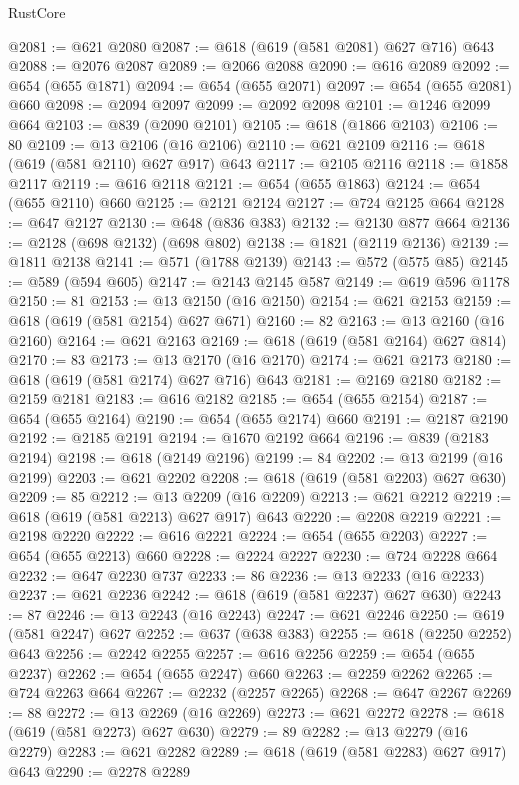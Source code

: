 \begin{lexlean}{RustCore}
\begin{coremodule}
@2081 := @621 @2080
@2087 := @618 (@619 (@581 @2081) @627 @716) @643
@2088 := @2076 @2087
@2089 := @2066 @2088
@2090 := @616 @2089
@2092 := @654 (@655 @1871)
@2094 := @654 (@655 @2071)
@2097 := @654 (@655 @2081) @660
@2098 := @2094 @2097
@2099 := @2092 @2098
@2101 := @1246 @2099 @664
@2103 := @839 (@2090 @2101)
@2105 := @618 (@1866 @2103)
@2106 := 80
@2109 := @13 @2106 (@16 @2106)
@2110 := @621 @2109
@2116 := @618 (@619 (@581 @2110) @627 @917) @643
@2117 := @2105 @2116
@2118 := @1858 @2117
@2119 := @616 @2118
@2121 := @654 (@655 @1863)
@2124 := @654 (@655 @2110) @660
@2125 := @2121 @2124
@2127 := @724 @2125 @664
@2128 := @647 @2127
@2130 := @648 (@836 @383)
@2132 := @2130 @877 @664
@2136 := @2128 (@698 @2132) (@698 @802)
@2138 := @1821 (@2119 @2136)
@2139 := @1811 @2138
@2141 := @571 (@1788 @2139)
@2143 := @572 (@575 @85)
@2145 := @589 (@594 @605)
@2147 := @2143 @2145 @587
@2149 := @619 @596 @1178
@2150 := 81
@2153 := @13 @2150 (@16 @2150)
@2154 := @621 @2153
@2159 := @618 (@619 (@581 @2154) @627 @671)
@2160 := 82
@2163 := @13 @2160 (@16 @2160)
@2164 := @621 @2163
@2169 := @618 (@619 (@581 @2164) @627 @814)
@2170 := 83
@2173 := @13 @2170 (@16 @2170)
@2174 := @621 @2173
@2180 := @618 (@619 (@581 @2174) @627 @716) @643
@2181 := @2169 @2180
@2182 := @2159 @2181
@2183 := @616 @2182
@2185 := @654 (@655 @2154)
@2187 := @654 (@655 @2164)
@2190 := @654 (@655 @2174) @660
@2191 := @2187 @2190
@2192 := @2185 @2191
@2194 := @1670 @2192 @664
@2196 := @839 (@2183 @2194)
@2198 := @618 (@2149 @2196)
@2199 := 84
@2202 := @13 @2199 (@16 @2199)
@2203 := @621 @2202
@2208 := @618 (@619 (@581 @2203) @627 @630)
@2209 := 85
@2212 := @13 @2209 (@16 @2209)
@2213 := @621 @2212
@2219 := @618 (@619 (@581 @2213) @627 @917) @643
@2220 := @2208 @2219
@2221 := @2198 @2220
@2222 := @616 @2221
@2224 := @654 (@655 @2203)
@2227 := @654 (@655 @2213) @660
@2228 := @2224 @2227
@2230 := @724 @2228 @664
@2232 := @647 @2230 @737
@2233 := 86
@2236 := @13 @2233 (@16 @2233)
@2237 := @621 @2236
@2242 := @618 (@619 (@581 @2237) @627 @630)
@2243 := 87
@2246 := @13 @2243 (@16 @2243)
@2247 := @621 @2246
@2250 := @619 (@581 @2247) @627
@2252 := @637 (@638 @383)
@2255 := @618 (@2250 @2252) @643
@2256 := @2242 @2255
@2257 := @616 @2256
@2259 := @654 (@655 @2237)
@2262 := @654 (@655 @2247) @660
@2263 := @2259 @2262
@2265 := @724 @2263 @664
@2267 := @2232 (@2257 @2265)
@2268 := @647 @2267
@2269 := 88
@2272 := @13 @2269 (@16 @2269)
@2273 := @621 @2272
@2278 := @618 (@619 (@581 @2273) @627 @630)
@2279 := 89
@2282 := @13 @2279 (@16 @2279)
@2283 := @621 @2282
@2289 := @618 (@619 (@581 @2283) @627 @917) @643
@2290 := @2278 @2289

\end{coremodule}
\end{lexlean}
